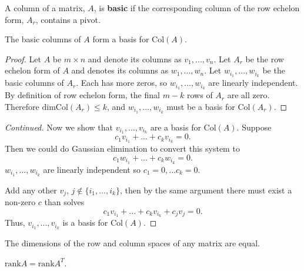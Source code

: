 \documentclass[compress]{beamer}
\newcommand{\rank}{\mathrm{rank}}
\newcommand{\col}{\mathrm{Col}}
\renewcommand{\dim}{\mathrm{dim}}
\begin{document}
\begin{frame}
  \begin{definition}
    A column of a matrix, $A$, is \textbf{basic} if the corresponding
    column of the row echelon form, $A_r$, contains a pivot.
  \end{definition}
  \begin{theorem}
    The basic columns of $A$ form a basis for $\col(A)$. 
  \end{theorem}
  \begin{proof}
    Let $A$ be $m \times n$ and denote its columns as $v_1,...,v_n$. Let
    $A_r$ be the row echelon form of $A$ and denotes its columns as
    $w_1,...,w_n$. Let $w_{i_1}, ..., w_{i_k}$ be the basic columns of
    $A_r$. Each has more zeros, so $w_{i_1},...,w_{i_k}$
    are linearly independent. By definition of row echelon form, the
    final $m-k$ rows of $A_r$ are all zero. Therefore $\dim \col(A_r) \leq
    k$, and $w_{i_1},...,w_{i_k}$ must be a basis for $\col(A_r)$.
  \end{proof}    
\end{frame}
\begin{frame}
  \begin{proof}[Continued]
    Now we show that $v_{i_1}, ..., v_{i_k}$ are a basis for
    $\col(A)$. Suppose
    \[ c_1 v_{i_1} + ... + c_k v_{i_k} = 0. \]
    Then we could do Gaussian elimination to convert this system to
    \[ c_1 w_{i_1} + ... + c_k w_{i_k} = 0. \]
    $w_{i_1},... , w_{i_k}$ are linearly independent so $c_1 = 0
    ,... c_k = 0$.
    
    Add any other $v_j$, $j \not\in \{i_1, ..., i_k\}$,
    then by the same argument there must exist a non-zero $c$ than
    solves 
    \[ c_1 v_{i_1} + ... + c_k v_{i_k} + c_j v_j = 0. \]
    Thus, $v_{i_1} , ..., v_{i_k}$ is a basis for $\col(A)$. 
  \end{proof}
\end{frame}

\begin{frame}
  \begin{corollary}
    The dimensions of the row and column spaces of any matrix are
    equal. 
  \end{corollary}
  \begin{corollary}
    $\rank A = \rank A^T$.
  \end{corollary}
\end{frame}
\end{document}
